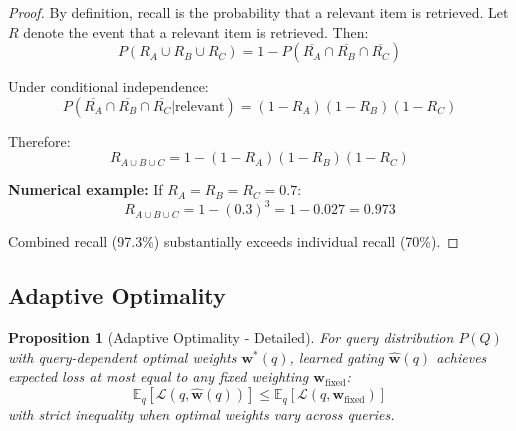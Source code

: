\documentclass[11pt]{article}
\newtheorem{proposition}[theorem]{Proposition}
\begin{document}
\begin{proof}
By definition, recall is the probability that a relevant item is retrieved. Let $R$ denote the event that a relevant item is retrieved. Then:
\begin{equation}
P(R_A \cup R_B \cup R_C) = 1 - P(\overline{R_A} \cap \overline{R_B} \cap \overline{R_C})
\end{equation}

Under conditional independence:
\begin{equation}
P(\overline{R_A} \cap \overline{R_B} \cap \overline{R_C} | \text{relevant}) = (1-R_A)(1-R_B)(1-R_C)
\end{equation}

Therefore:
\begin{equation}
R_{A \cup B \cup C} = 1 - (1-R_A)(1-R_B)(1-R_C)
\end{equation}

\textbf{Numerical example:} If $R_A = R_B = R_C = 0.7$:
\begin{equation}
R_{A \cup B \cup C} = 1 - (0.3)^3 = 1 - 0.027 = 0.973
\end{equation}

Combined recall (97.3\%) substantially exceeds individual recall (70\%).
\end{proof}

\subsection{Adaptive Optimality}

\begin{proposition}[Adaptive Optimality - Detailed]
\label{prop:adaptive_full}
For query distribution $P(Q)$ with query-dependent optimal weights $\mathbf{w}^*(q)$, learned gating $\hat{\mathbf{w}}(q)$ achieves expected loss at most equal to any fixed weighting $\mathbf{w}_{\text{fixed}}$:
\begin{equation}
\mathbb{E}_q[\mathcal{L}(q, \hat{\mathbf{w}}(q))] \leq \mathbb{E}_q[\mathcal{L}(q, \mathbf{w}_{\text{fixed}})]
\end{equation}
with strict inequality when optimal weights vary across queries.
\end{proposition}
\end{document}

